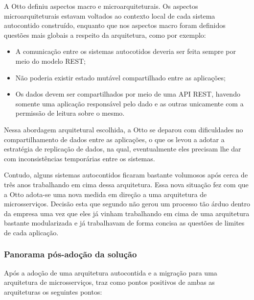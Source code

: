 A Otto definiu aspectos macro e microarquiteturais. Os aspectos
microarquiteturais estavam voltados ao contexto local de cada sistema autocontido construído,
enquanto que nos aspectos macro foram definidos questões mais globais a respeito da arquitetura, como por exemplo:

\begin{itemize}
    \item A comunicação entre os sistemas autocotidos deveria ser feita sempre por meio do modelo
        \gls{REST};
    \item Não poderia existir estado mutável compartilhado entre as aplicações;
    \item Os dados devem ser compartilhados por meio de uma \gls{API} \gls{REST}, havendo somente
        uma aplicação responsável pelo dado e as outras unicamente com a permissão de leitura sobre o
        mesmo.
\end{itemize}

Nessa abordagem arquitetural escolhida, a Otto se deparou com dificuldades no compartilhamento
de dados entre as aplicações, o que os levou a adotar a estratégia de replicação de dados, na qual,
eventualmente eles precisam lhe dar com inconsistências temporárias entre os sistemas.

Contudo, alguns sistemas autocontidos ficaram bastante volumosos após cerca de três anos trabalhando
em cima dessa arquitetura. Essa nova situação fez com que a Otto adota-se uma nova medida em direção
a uma arquitetura de microsserviços. Decisão esta que segundo 
não gerou um processo tão árduo dentro da empresa uma vez que eles já vinham trabalhando em cima de
uma arquitetura bastante modularizada e já trabalhavam de forma concisa as questões de limites de
cada aplicação.

\subsubsection{Panorama pós-adoção da solução}

Após a adoção de uma arquitetura autocontida e a migração para uma arquitetura de microsserviços,
 traz como pontos positivos de ambas as arquiteturas os
seguintes pontos:

